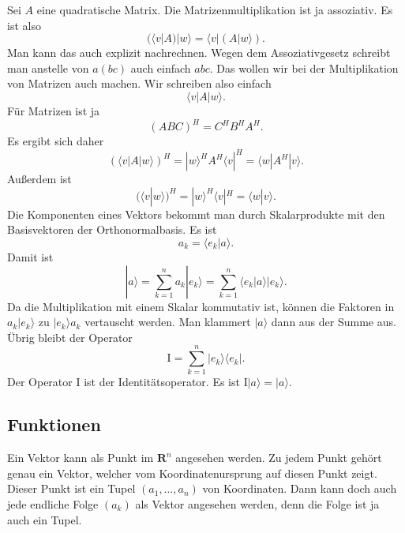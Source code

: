 \documentclass[a4paper,11pt,fleqn,twocolumn,twoside]{scrartcl}
\numberwithin{equation}{section}
\begin{document}
Sei $A$ eine quadratische Matrix. Die Matrizenmultiplikation ist
ja assoziativ. Es ist also
\begin{equation}
(\langle v|A)|w\rangle = \langle v|(A|w\rangle).
\end{equation}
Man kann das auch explizit nachrechnen. Wegen dem Assoziativgesetz
schreibt man anstelle von $a(bc)$ auch einfach $abc$. Das wollen
wir bei der Multiplikation von Matrizen auch machen. Wir schreiben also einfach
\begin{equation}
\langle v|A|w\rangle.
\end{equation}
Für Matrizen ist ja
\begin{equation}
(ABC)^H = C^HB^HA^H.
\end{equation}
Es ergibt sich daher
\begin{equation}
(\langle v|A|w\rangle)^H = |w\rangle^H A^H \langle v|^H
= \langle w|A^H|v\rangle.
\end{equation}
Außerdem ist
\begin{equation}
(\langle v|w\rangle)^H = |w\rangle^H\langle v|^H
= \langle w|v\rangle.
\end{equation}
Die Komponenten eines Vektors bekommt man durch Skalarprodukte mit
den Basisvektoren der Orthonormalbasis. Es ist
\begin{equation}
a_k = \langle e_k|a\rangle.
\end{equation}
Damit ist
\begin{equation}
|a\rangle = \sum_{k=1}^n a_k |e_k\rangle
= \sum_{k=1}^n \langle e_k|a\rangle |e_k\rangle.
\end{equation}
Da die Multiplikation mit einem Skalar kommutativ ist, können die
Faktoren in $a_k|e_k\rangle$ zu $|e_k\rangle a_k$ vertauscht
werden. Man klammert $|a\rangle$ dann aus der Summe aus.
Übrig bleibt der Operator
\begin{equation}
\mathrm I = \sum_{k=1}^n |e_k\rangle\langle e_k|.
\end{equation}
Der Operator $\mathrm I$ ist der Identitätsoperator.
Es ist $\mathrm I|a\rangle = |a\rangle$.


\subsection{Funktionen}

Ein Vektor kann als Punkt im $\mathbf R^n$ angesehen werden.
Zu jedem Punkt gehört genau ein Vektor, welcher vom
Koordinatenursprung auf diesen Punkt zeigt. Dieser Punkt ist
ein Tupel $(a_1,\ldots,a_n)$ von Koordinaten. Dann kann doch auch
jede endliche Folge $(a_k)$ als Vektor angesehen werden, denn die
Folge ist ja auch ein Tupel.
\end{document}
